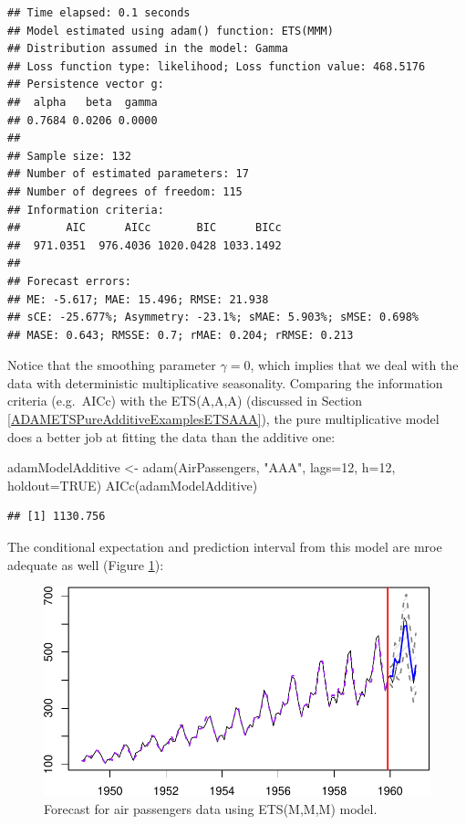 \documentclass[
]{book}
\newenvironment{Shaded}{\begin{snugshade}}{\end{snugshade}}
\newcommand{\AttributeTok}[1]{\textcolor[rgb]{0.77,0.63,0.00}{#1}}
\newcommand{\ConstantTok}[1]{\textcolor[rgb]{0.00,0.00,0.00}{#1}}
\newcommand{\DecValTok}[1]{\textcolor[rgb]{0.00,0.00,0.81}{#1}}
\newcommand{\FunctionTok}[1]{\textcolor[rgb]{0.00,0.00,0.00}{#1}}
\newcommand{\NormalTok}[1]{#1}
\newcommand{\OtherTok}[1]{\textcolor[rgb]{0.56,0.35,0.01}{#1}}
\newcommand{\StringTok}[1]{\textcolor[rgb]{0.31,0.60,0.02}{#1}}
\theoremstyle{definition}
\theoremstyle{definition}
\theoremstyle{definition}
\theoremstyle{definition}
\theoremstyle{remark}
\begin{document}
\begin{verbatim}
## Time elapsed: 0.1 seconds
## Model estimated using adam() function: ETS(MMM)
## Distribution assumed in the model: Gamma
## Loss function type: likelihood; Loss function value: 468.5176
## Persistence vector g:
##  alpha   beta  gamma 
## 0.7684 0.0206 0.0000 
## 
## Sample size: 132
## Number of estimated parameters: 17
## Number of degrees of freedom: 115
## Information criteria:
##       AIC      AICc       BIC      BICc 
##  971.0351  976.4036 1020.0428 1033.1492 
## 
## Forecast errors:
## ME: -5.617; MAE: 15.496; RMSE: 21.938
## sCE: -25.677%; Asymmetry: -23.1%; sMAE: 5.903%; sMSE: 0.698%
## MASE: 0.643; RMSSE: 0.7; rMAE: 0.204; rRMSE: 0.213
\end{verbatim}

Notice that the smoothing parameter \(\gamma=0\), which implies that we deal with the data with deterministic multiplicative seasonality. Comparing the information criteria (e.g.~AICc) with the ETS(A,A,A) (discussed in Section \ref{ADAMETSPureAdditiveExamplesETSAAA}), the pure multiplicative model does a better job at fitting the data than the additive one:

\begin{Shaded}
\begin{Highlighting}[]
\NormalTok{adamModelAdditive }\OtherTok{\textless{}{-}} \FunctionTok{adam}\NormalTok{(AirPassengers, }\StringTok{"AAA"}\NormalTok{, }\AttributeTok{lags=}\DecValTok{12}\NormalTok{,}
                          \AttributeTok{h=}\DecValTok{12}\NormalTok{, }\AttributeTok{holdout=}\ConstantTok{TRUE}\NormalTok{)}
\FunctionTok{AICc}\NormalTok{(adamModelAdditive)}
\end{Highlighting}
\end{Shaded}

\begin{verbatim}
## [1] 1130.756
\end{verbatim}

The conditional expectation and prediction interval from this model are mroe adequate as well (Figure \ref{fig:AirPassengersMMMForecast}):

\begin{figure}
\centering
\includegraphics{Svetunkov--2022----ADAM_files/figure-latex/AirPassengersMMMForecast-1.pdf}
\caption{\label{fig:AirPassengersMMMForecast}Forecast for air passengers data using ETS(M,M,M) model.}
\end{figure}
\end{document}
